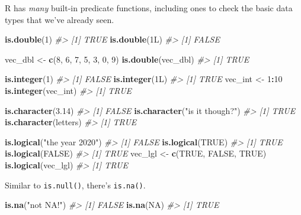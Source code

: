 \documentclass[
]{report}
\newenvironment{Shaded}{\begin{snugshade}}{\end{snugshade}}
\newcommand{\CommentTok}[1]{\textcolor[rgb]{0.56,0.35,0.01}{\textit{#1}}}
\newcommand{\DecValTok}[1]{\textcolor[rgb]{0.00,0.00,0.81}{#1}}
\newcommand{\FloatTok}[1]{\textcolor[rgb]{0.00,0.00,0.81}{#1}}
\newcommand{\KeywordTok}[1]{\textcolor[rgb]{0.13,0.29,0.53}{\textbf{#1}}}
\newcommand{\NormalTok}[1]{#1}
\newcommand{\OperatorTok}[1]{\textcolor[rgb]{0.81,0.36,0.00}{\textbf{#1}}}
\newcommand{\OtherTok}[1]{\textcolor[rgb]{0.56,0.35,0.01}{#1}}
\newcommand{\StringTok}[1]{\textcolor[rgb]{0.31,0.60,0.02}{#1}}
\begin{document}
R has \emph{many} built-in predicate functions, including ones to check the basic data types that we've already seen.

\begin{Shaded}
\begin{Highlighting}[]
\KeywordTok{is.double}\NormalTok{(}\DecValTok{1}\NormalTok{)}
\CommentTok{\#\textgreater{} [1] TRUE}
\KeywordTok{is.double}\NormalTok{(1L)}
\CommentTok{\#\textgreater{} [1] FALSE}

\NormalTok{vec\_dbl \textless{}{-}}\StringTok{ }\KeywordTok{c}\NormalTok{(}\DecValTok{8}\NormalTok{, }\DecValTok{6}\NormalTok{, }\DecValTok{7}\NormalTok{, }\DecValTok{5}\NormalTok{, }\DecValTok{3}\NormalTok{, }\DecValTok{0}\NormalTok{, }\DecValTok{9}\NormalTok{)}
\KeywordTok{is.double}\NormalTok{(vec\_dbl)}
\CommentTok{\#\textgreater{} [1] TRUE}

\KeywordTok{is.integer}\NormalTok{(}\DecValTok{1}\NormalTok{)}
\CommentTok{\#\textgreater{} [1] FALSE}
\KeywordTok{is.integer}\NormalTok{(1L)}
\CommentTok{\#\textgreater{} [1] TRUE}
\NormalTok{vec\_int \textless{}{-}}\StringTok{ }\DecValTok{1}\OperatorTok{:}\DecValTok{10}
\KeywordTok{is.integer}\NormalTok{(vec\_int)}
\CommentTok{\#\textgreater{} [1] TRUE}

\KeywordTok{is.character}\NormalTok{(}\FloatTok{3.14}\NormalTok{)}
\CommentTok{\#\textgreater{} [1] FALSE}
\KeywordTok{is.character}\NormalTok{(}\StringTok{"is it though?"}\NormalTok{)}
\CommentTok{\#\textgreater{} [1] TRUE}
\KeywordTok{is.character}\NormalTok{(letters)}
\CommentTok{\#\textgreater{} [1] TRUE}

\KeywordTok{is.logical}\NormalTok{(}\StringTok{"the year 2020"}\NormalTok{)}
\CommentTok{\#\textgreater{} [1] FALSE}
\KeywordTok{is.logical}\NormalTok{(}\OtherTok{TRUE}\NormalTok{)}
\CommentTok{\#\textgreater{} [1] TRUE}
\KeywordTok{is.logical}\NormalTok{(}\OtherTok{FALSE}\NormalTok{)}
\CommentTok{\#\textgreater{} [1] TRUE}
\NormalTok{vec\_lgl \textless{}{-}}\StringTok{ }\KeywordTok{c}\NormalTok{(}\OtherTok{TRUE}\NormalTok{, }\OtherTok{FALSE}\NormalTok{, }\OtherTok{TRUE}\NormalTok{)}
\KeywordTok{is.logical}\NormalTok{(vec\_lgl)}
\CommentTok{\#\textgreater{} [1] TRUE}
\end{Highlighting}
\end{Shaded}

Similar to \texttt{is.null()}, there's \texttt{is.na()}.

\begin{Shaded}
\begin{Highlighting}[]
\KeywordTok{is.na}\NormalTok{(}\StringTok{"not NA!"}\NormalTok{)}
\CommentTok{\#\textgreater{} [1] FALSE}
\KeywordTok{is.na}\NormalTok{(}\OtherTok{NA}\NormalTok{)}
\CommentTok{\#\textgreater{} [1] TRUE}
\end{Highlighting}
\end{Shaded}
\end{document}
